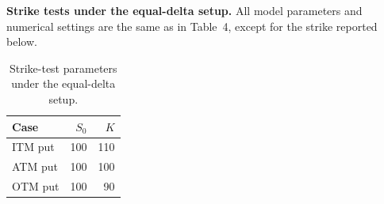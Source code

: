 \documentclass[11pt]{article}
\begin{document}
\textbf{Strike tests under the equal-delta setup.} All model parameters and numerical settings are the
same as in Table~4, except for the strike reported below.

\begin{table}[H]
\centering
\caption{Strike-test parameters under the equal-delta setup.}
\begin{tabular}{lrr}
\toprule
Case & $S_0$ & $K$ \\
\midrule
ITM put & 100 & 110 \\
ATM put & 100 & 100 \\
OTM put & 100 & 90 \\
\bottomrule
\end{tabular}
\end{table}

\begin{table}[H]
\centering
\caption{Strike-test results under the equal-delta setup.}
\end{table}
\end{document}
